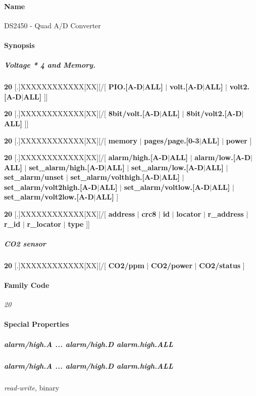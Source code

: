 \paragraph*{Name}
DS2450 - Quad A/D Converter 
\paragraph*{Synopsis}

\subparagraph*{Voltage * 4  and Memory.}

\textbf{20}
[.]XXXXXXXXXXXX[XX][/[ \textbf{PIO.[A-D$|$ALL]} $|$ \textbf{volt.[A-D$|$ALL]} $|$ \textbf{volt2.[A-D$|$ALL]} ]] 

\textbf{20} [.]XXXXXXXXXXXX[XX][/[
\textbf{8bit/volt.[A-D$|$ALL]} $|$ \textbf{8bit/volt2.[A-D$|$ALL]} ]] 

\textbf{20} [.]XXXXXXXXXXXX[XX][/[ \textbf{memory}
$|$ \textbf{pages/page.[0-3$|$ALL]} $|$ \textbf{power} ] 

\textbf{20} [.]XXXXXXXXXXXX[XX][/[ \textbf{alarm/high.[A-D$|$ALL]}
$|$ \textbf{alarm/low.[A-D$|$ALL]} $|$ \textbf{set\_alarm/high.[A-D$|$ALL]} $|$ \textbf{set\_alarm/low.[A-D$|$ALL]} $|$ \textbf{set\_alarm/unset}
$|$ \textbf{set\_alarm/volthigh.[A-D$|$ALL]} $|$ \textbf{set\_alarm/volt2high.[A-D$|$ALL]} $|$ \textbf{set\_alarm/voltlow.[A-D$|$ALL]}
$|$ \textbf{set\_alarm/volt2low.[A-D$|$ALL]} ] 

\textbf{20} [.]XXXXXXXXXXXX[XX][/[           \textbf{address}
$|$ \textbf{crc8} $|$ \textbf{id} $|$ \textbf{locator} $|$ \textbf{r\_address} $|$ \textbf{r\_id} $|$ \textbf{r\_locator} $|$ \textbf{type}  ]] 
\subparagraph*{CO2 sensor}

\textbf{20} [.]XXXXXXXXXXXX[XX][/[
\textbf{CO2/ppm} $|$ \textbf{CO2/power} $|$ \textbf{CO2/status} ] 
\paragraph*{Family Code}


\textit{20} 
\paragraph*{Special Properties}

\subparagraph*{alarm/high.A
... alarm/high.D alarm.high.ALL}
\subparagraph*{alarm/high.A ... alarm/high.D alarm.high.ALL}\textit{read-write,}
binary 


